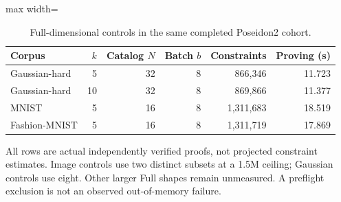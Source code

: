 \begin{table}[tp]
\caption{Full-dimensional controls in the same completed Poseidon2 cohort.}\label{tab:earlier-full}
\centering\small
\begin{adjustbox}{max width=\textwidth}
\begin{tabular}{@{}lrrrrr@{}}
\toprule
Corpus & $k$ & Catalog $N$ & Batch $b$ & Constraints & Proving (s) \\
\midrule
Gaussian-hard & 5 & 32 & 8 & 866,346 & 11.723 \\
Gaussian-hard & 10 & 32 & 8 & 869,866 & 11.377 \\
MNIST & 5 & 16 & 8 & 1,311,683 & 18.519 \\
Fashion-MNIST & 5 & 16 & 8 & 1,311,719 & 17.869 \\
\bottomrule
\end{tabular}
\end{adjustbox}
\par\vspace{3pt}\begin{minipage}{0.98\textwidth}\footnotesize All rows are actual independently verified proofs, not projected constraint estimates. Image controls use two distinct subsets at a 1.5M ceiling; Gaussian controls use eight. Other larger Full shapes remain unmeasured. A preflight exclusion is not an observed out-of-memory failure.\end{minipage}
\end{table}
